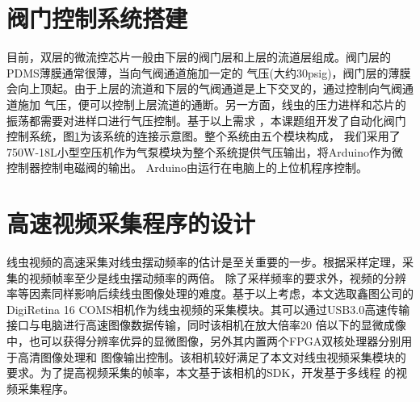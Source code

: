 \section{阀门控制系统搭建}
	目前，双层的微流控芯片一般由下层的阀门层和上层的流道层组成。阀门层的PDMS薄膜通常很薄，当向气阀通道施加一定的
	气压(大约30psig)，阀门层的薄膜会向上顶起。由于上层的流道和下层的气阀通道是上下交叉的，通过控制向气阀通道施加
	气压，便可以控制上层流道的通断。另一方面，线虫的压力进样和芯片的振荡都需要对进样口进行气压控制。基于以上需求
	，本课题组开发了自动化阀门控制系统，图\ref{fig:flow_chart}为该系统的连接示意图。整个系统由五个模块构成，
	我们采用了750W-18L小型空压机作为气泵模块为整个系统提供气压输出，将Arduino作为微控制器控制电磁阀的输出。
	Arduino由运行在电脑上的上位机程序控制。

	\begin{figure}[!htp]
    \centering
	
    \label{fig:flow_chart}
	\end{figure}
\section{高速视频采集程序的设计}
	线虫视频的高速采集对线虫摆动频率的估计是至关重要的一步。根据采样定理，采集的视频帧率至少是线虫摆动频率的两倍。
	除了采样频率的要求外，视频的分辨率等因素同样影响后续线虫图像处理的难度。基于以上考虑，本文选取鑫图公司的DigiRetina 16
	 COMS相机作为线虫视频的采集模块。其可以通过USB3.0高速传输接口与电脑进行高速图像数据传输，同时该相机在放大倍率20
	 倍以下的显微成像中，也可以获得分辨率优异的显微图像，另外其内置两个FPGA双核处理器分别用于高清图像处理和
	 图像输出控制。该相机较好满足了本文对线虫视频采集模块的要求。为了提高视频采集的帧率，本文基于该相机的SDK，开发基于多线程
	 的视频采集程序。
	 
